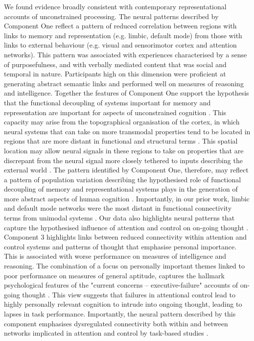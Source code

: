 We found evidence broadly consistent with contemporary representational accounts of unconstrained processing. The neural patterns described by Component One reflect a pattern of reduced correlation between regions with links to memory and representation (e.g. limbic, default mode) from those with links to external behaviour (e.g. visual and sensorimotor cortex and attention networks). This pattern was associated with experiences characterised by a sense of purposefulness, and with verbally mediated content that was social and temporal in nature. Participants high on this dimension were proficient at generating abstract semantic links and performed well on measures of reasoning and intelligence. Together the features of Component One support the hypothesis that the functional decoupling of systems important for memory and representation are important for aspects of unconstrained cognition \cite{SmallwoodFrontiers2013}.
This capacity may arise from the topographical organisation of the cortex, in which neural systems that can take on more transmodal properties tend to be located in regions that are more distant in functional and structural terms \cite{Buckner2013,Margulies2016,Mesulam1998}.
This spatial location may allow neural signals in these regions to take on properties that are discrepant from the neural signal more closely tethered to inputs describing the external world \cite{Buckner2013,Friston2013}.
The pattern identified by Component One, therefore, may reflect a pattern of population variation describing the hypothesised role of functional decoupling of memory and representational systems plays in the generation of more abstract aspects of human cognition \cite{Margulies2016,Mesulam1998}.
Importantly, in our prior work, limbic and default mode networks were the most distant in functional connectivity terms from unimodal systems \cite{Margulies2016}.
Our data also highlights neural patterns that capture the hypothesised influence of attention and control on on-going thought \cite{McVay2009}.
Component 3 highlights links between reduced connectivity within attention and control systems and patterns of thought that emphasise personal importance. This is associated with worse performance on measures of intelligence and reasoning. The combination of a focus on personally important themes linked to poor performance on measures of general aptitude, captures the hallmark psychological features of the "current concerns -- executive-failure" accounts of on-going thought \cite{McVay2009}.
This view suggests that failures in attentional control lead to highly personally relevant cognition to intrude into ongoing thought, leading to lapses in task performance. Importantly, the neural pattern described by this component emphasises dysregulated connectivity both within and between networks implicated in attention and control by task-based studies \cite{Duncan2010}.
